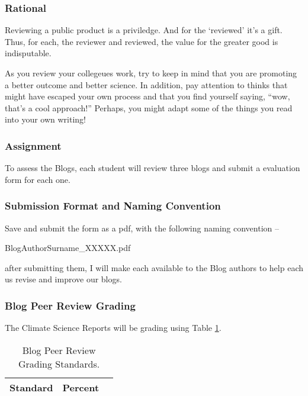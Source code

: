 
\subsubsection{Rational}

Reviewing a public product is a priviledge. And for the `reviewed' it's a gift. Thus, for each, the reviewer and reviewed, the value for the greater good is indisputable. 

As you review your collegeues work, try to keep in mind that you are promoting a better outcome and better science. In addition, pay attention to thinks that might have escaped your own process and that you find yourself saying, ``wow, that's a cool approach!''  Perhaps, you might adapt some of the things you read into your own writing!

\subsubsection{Assignment}

To assess the Blogs, each student will review three blogs and submit a evaluation form for each one. 

\subsubsection{Submission Format and Naming Convention}

Save and submit the form as a pdf, with the following naming convention -- 

\begin{center}
BlogAuthorSurname\_XXXXX.pdf
\end{center}

\noindent after submitting them, I will make each available to the Blog authors to help each us revise and improve our blogs. 

\subsubsection{Blog Peer Review Grading}

The Climate Science Reports will be grading using Table \ref{tab:blogpeerreviewgrading}. 

\begin{table}[h]
\caption{Blog Peer Review Grading Standards.}
\label{tab:blogpeerreviewgrading}
\begin{tabular}{lll}\hline
Standard      &   Percent   & \\ \hline\hline
\hline
\end{tabular}
\end{table}

